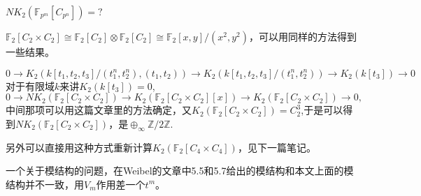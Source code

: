 $NK_2(\mathbb{F}_{p^m}[C_{p^n}])=?$

$\mathbb{F}_2[C_2\times C_2] \cong\mathbb{F}_2[C_2]\otimes\mathbb{F}_2[C_2] \cong \mathbb{F}_2[x,y]/(x^2,y^2)$，可以用同样的方法得到一些结果。



\[
	0\longrightarrow K_2(k[t_1,t_2,t_3]/(t_1^n,t_2^n),(t_1,t_2)) \longrightarrow K_2(k[t_1,t_2,t_3]/(t_1^n,t_2^n)) \longrightarrow K_2(k[t_3]) \longrightarrow 0
	\]
对于有限域$k$来讲$K_2(k[t_3])=0$,
\[0\longrightarrow NK_2(\mathbb{F}_2[C_{2}\times C_2]) \longrightarrow K_2(\mathbb{F}_2[C_{2}\times C_2][x])\longrightarrow K_2(\mathbb{F}_2[C_{2}\times C_2]) \longrightarrow 0,\]
中间那项可以用这篇文章里的方法确定，又$K_2(\mathbb{F}_2[C_{2}\times C_2])=C_2^3$,于是可以得到$NK_2(\mathbb{F}_2[C_{2}\times C_2])$，是$\oplus_{\infty} \mathbb{Z}/2 \mathbb{Z}$.

另外可以直接用这种方式重新计算$K_2(\mathbb{F}_2[C_4\times C_4])$，见下一篇笔记。


一个关于模结构的问题，在Weibel的文章\cite{MR88f:18018}中5.5和5.7给出的模结构和本文上面的模结构并不一致，用$V_m$作用差一个$t^m$。